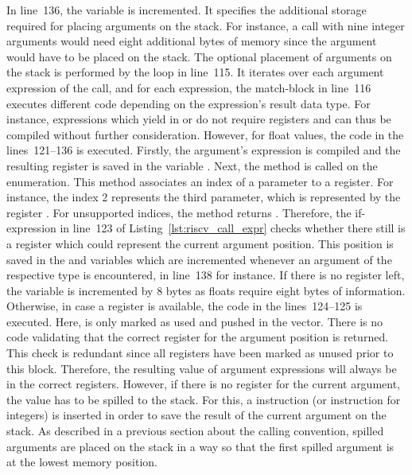 In line~136, the  variable is incremented.
It specifies the additional storage required for placing arguments on the stack.
For instance, a call with nine integer arguments would need eight additional bytes of memory since the  argument would have to be placed on the stack.
The optional placement of arguments on the stack is performed by the loop in line~115.
It iterates over each argument expression of the call, and for each expression, the match-block in line~116 executes different code depending on the expression's result data type.
For instance, expressions which yield in \qVerb{()} or \qVerb{!} do not require registers and can thus be compiled without further consideration.
However, for float values, the code in the lines~121--136 is executed.
Firstly, the argument's expression is compiled and the resulting register is saved in the variable .
Next, the  method is called on the  enumeration.
This method associates an index of a parameter to a register.
For instance, the index 2 represents the third parameter, which is represented by the register .
For unsupported indices, the method returns .
Therefore, the if-expression in line~123 of Listing~\ref{lst:riscv_call_expr} checks whether there still is a register which could represent the current argument position.
This position is saved in the  and  variables which are incremented whenever an argument of the respective type is encountered, in line~138 for instance.
If there is no register left, the  variable is incremented by 8 bytes as floats require eight bytes of information.
Otherwise, in case a register is available, the code in the lines~124--125 is executed.
Here,  is only marked as used and pushed in the  vector.
There is no code validating that the correct register for the argument position is returned.
This check is redundant since all registers have been marked as unused prior to this block.
Therefore, the resulting value of argument expressions will always be in the correct registers.
However, if there is no register for the current argument, the value has to be spilled to the stack.
For this, a  instruction (or  instruction for integers) is inserted in order to save the result of the current argument on the stack.
As described in a previous section about the \riscv{} calling convention, spilled arguments are placed on the stack in a way so that the first spilled argument is at the lowest memory position.
